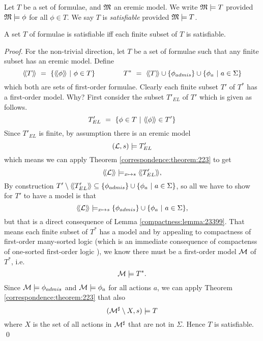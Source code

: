 \begin{definition}
Let $T$ be a set of \ELABR{} formulae, and $\frak{M}$ an eremic model.  We
write $\frak{M} \models T$ provided $\frak{M} \models \phi$ for all $\phi \in
T$.  We say $T$ is \emph{satisfiable} provided $\frak{M} \models T$.
\end{definition}

\begin{theorem}
A set $T$ of \ELABR{} formulae is satisfiable iff each finite subset of
$T$ is satisfiable.
\end{theorem}
\begin{proof}
For the non-trivial direction, let $T$ be a set of \ELABR{} formulae
such that any finite subset has an eremic model. Define 
\[
  \SEMBTWO{T} 
     \ =\ 
  \{\SEMBTWO{\phi}\ |\ \phi \in T\} 
     \qquad\qquad
  T^*
     \ =\ 
  \SEMBTWO{T} \cup \{\phi_{admis}\} \cup \{ \phi_a\ |\ a \in \Sigma\}
\]
which both are sets of first-order formulae. Clearly each finite subset $T'$ of 
$T^*$ has a first-order model. Why? First consider the subset $T'_{EL}$ of $T'$
which is given as follows.
\[
   T'_{EL} \ =\ \{ \phi \in T\ |\ \langle\!\langle \phi \rangle\!\rangle \in T' \}
\]
Since $T'_{EL}$ is finite, by assumption there is an eremic model 
\[
   (\mathcal{L}, s) \models T'_{EL}
\]
which means we can apply Theorem \ref{correspondence:theorem:223} to get
\[
   \langle\!\langle \mathcal{L} \rangle\!\rangle \models_{x \mapsto s} \langle\!\langle T'_{EL} \rangle\!\rangle,
\]
By construction $T' \setminus \langle\!\langle T'_{EL} \rangle\!\rangle \subseteq
\{\phi_{admis}\} \cup \{ \phi_a\ |\ a \in \Sigma\}$, so all we have to
show for $T'$ to have a model is that
\[
    \langle\!\langle \mathcal{L} \rangle\!\rangle \models_{x \mapsto s} \{\phi_{admis}\} \cup \{ \phi_a\ |\ a \in \Sigma\},
\]
but that is a direct consequence of Lemma
\ref{compactness:lemma:23399}.  That
means each finite subset of $T^*$ has a model and by appealing to
compactness of first-order many-sorted logic (which is an immediate
consequence of compactenss of one-sorted first-order logic
\cite{EndertonHB:matinttl}), we know there must be a first-order model
$\mathcal{M}$ of $T^*$, i.e.
\[
   \mathcal{M} \models T^*.
\]
Since $\mathcal{M} \models \phi_{admis}$ and $\mathcal{M} \models \phi_a$ for all actions $a$, 
we can apply Theorem \ref{correspondence:theorem:223} that also
\[
   (\mathcal{M}^{\sharp} \setminus X, s) \models T
\]
where $X$ is the set of all actions in $\mathcal{M}^{\sharp}$ that are not
in $\Sigma$. Hence $T$ is satisfiable.
 \qed
\end{proof}





